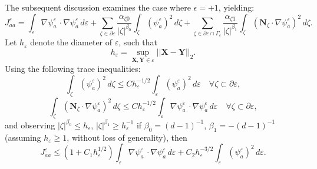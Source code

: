 The subsequent discussion examines the case where $\epsilon = +1$, yielding:
\begin{equation}
	J^{\varepsilon}_{aa} = \int_{\varepsilon} \nabla \psi^{\varepsilon}_{a} \, \cdot \nabla \psi^{\varepsilon}_{a} \, d \varepsilon + \sum_{\zeta \in \partial \varepsilon} \frac{\alpha_{\zeta0}}{|\zeta|^{\beta_0}} \int_{\zeta} \left( \psi_a^{\varepsilon} \right)^2 \, d \zeta + \sum_{\zeta \in \partial \varepsilon \cap \Gamma_\varepsilon} \frac{\alpha_{\zeta1}}{|\zeta|^{\beta_1}} \int_{\zeta} \left( \mathbf{N}_{\zeta} \cdot \nabla \psi^{\varepsilon}_a \right)^2 \, d \zeta.
\end{equation}
Let $h_{\varepsilon}$ denote the diameter of $\varepsilon$, such that
\begin{equation}
	h_{\varepsilon} = \sup_{\mathbf{X}, \mathbf{Y} \in \varepsilon} ||\mathbf{X} - \mathbf{Y}||_2.
\end{equation}
Using the following trace inequalities:
\begin{equation}
	\int_{\zeta} \left( \psi_a^{\varepsilon} \right)^2 \, d \zeta \leq C h_\varepsilon^{-1/2} \int_{\varepsilon} \left( \psi_a^{\varepsilon} \right)^2 \, d \varepsilon \quad \forall \zeta \subset \partial \varepsilon,
\end{equation}
\begin{equation}
	\int_{\zeta} \left( \mathbf{N}_{\zeta} \cdot \nabla \psi^{\varepsilon}_a \right)^2 \, d \zeta \leq C h_\varepsilon^{-1/2} \int_{\varepsilon} \nabla \psi^{\varepsilon}_{a} \, \cdot \nabla \psi^{\varepsilon}_{a} \, d \varepsilon \quad \forall \zeta \subset \partial \varepsilon,
\end{equation}
and observing $|\zeta|^{\beta_0} \leq h_\varepsilon$, $|\zeta|^{\beta_1} \geq h_\varepsilon^{-1}$ if $\beta_0 = (d-1)^{-1}$, $\beta_1 = -(d-1)^{-1}$ (assuming $h_\varepsilon \geq 1$, without loss of generality), then
\begin{equation}
	J^{\varepsilon}_{aa} \leq (1 + C_1 h_\varepsilon^{1/2}) \int_{\varepsilon} \nabla \psi^{\varepsilon}_{a} \, \cdot \nabla \psi^{\varepsilon}_{a} \, d \varepsilon + C_2 h_\varepsilon^{-3/2} \int_{\varepsilon} \left( \psi_a^{\varepsilon} \right)^2 \, d \varepsilon.
\end{equation}

